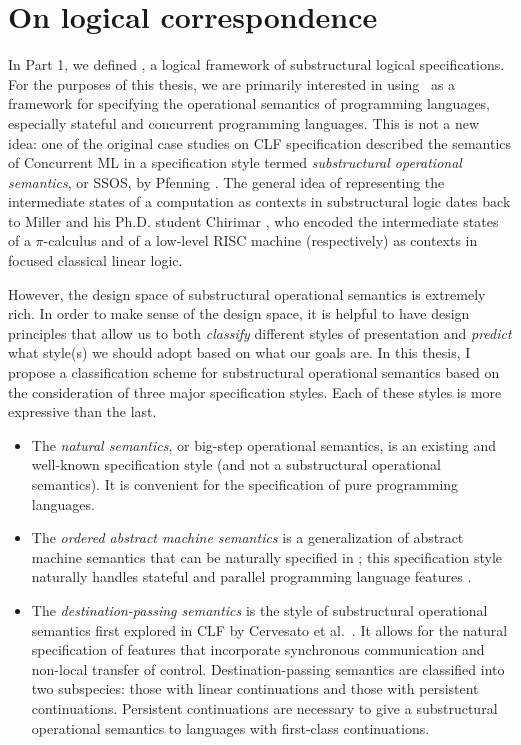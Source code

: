 \chapter{On logical correspondence}

In Part 1, we defined \sls, a logical framework of substructural
logical specifications. For the purposes of this thesis, we are
primarily interested in using \sls~as a framework for specifying the
operational semantics of programming languages, especially stateful
and concurrent programming languages. This is not a new idea: one of
the original case studies on CLF specification described the semantics
of Concurrent ML \cite{cervesato02concurrent} in a specification style
termed {\it substructural operational semantics}, or SSOS, by Pfenning
\cite{pfenning04substructural}. The general idea of representing the
intermediate states of a computation as contexts in substructural
logic dates back to Miller \cite{miller92pi} and his Ph.D. student
Chirimar \cite{chirimar95proof}, who encoded the intermediate states
of a $\pi$-calculus and of a low-level RISC machine (respectively) as
contexts in focused classical linear logic.

However, the design space of substructural operational semantics is
extremely rich. In order to make sense of the design space, it is
helpful to have design principles that allow us to both {\it classify}
different styles of presentation and {\it predict} what style(s) we
should adopt based on what our goals are. In this thesis, I propose a
classification scheme for substructural operational semantics based on
the consideration of three major specification styles.  Each of these
styles is more expressive than the last.

\begin{itemize}
\item The {\it natural semantics}, or big-step operational semantics,
  is an existing and well-known specification style (and not a
  substructural operational semantics). It is convenient for the
  specification of pure programming languages.

\item The {\it ordered abstract machine semantics} is a generalization
  of abstract machine semantics that can be naturally specified in
  \sls; this specification style naturally handles stateful and
  parallel programming language features
  \cite{pfenning09substructural}.

\item The {\it destination-passing semantics} is the style of
  substructural operational semantics first explored in CLF by
  Cervesato et al.~\cite{cervesato02concurrent}. It allows for the
  natural specification of features that incorporate synchronous
  communication and non-local transfer of control. Destination-passing
  semantics are classified into two subspecies: those with linear
  continuations and those with persistent continuations. Persistent
  continuations are necessary to give a substructural operational
  semantics to languages with first-class continuations.
\end{itemize}


